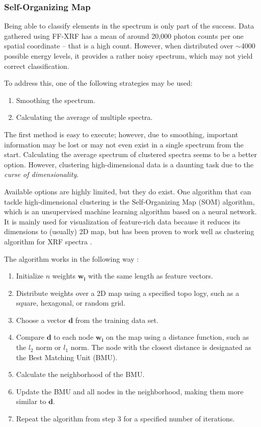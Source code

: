 \subsubsection{Self-Organizing Map}
Being able to classify elements in the spectrum is only part of the success. Data gathered using FF-XRF has a mean of around 20,000 photon counts per one spatial coordinate – that is a high count. However, when distributed over $\sim$4000 possible energy levels, it provides a rather noisy spectrum, which may not yield correct classification.

To address this, one of the following strategies may be used:
\begin{enumerate}
  \item Smoothing the spectrum.
  \item Calculating the average of multiple spectra.
\end{enumerate}

The first method is easy to execute; however, due to smoothing, important information may be lost or may not even exist in a single spectrum from the start. 
Calculating the average spectrum of clustered spectra seems to be a better option. 
However, clustering high-dimensional data is a daunting task due to the \emph{curse of dimensionality}.

Available options are highly limited, but they do exist. 
One algorithm that can tackle high-dimensional clustering is the Self-Organizing Map (SOM) algorithm, which is an unsupervised machine learning algorithm based on a neural network. 
It is mainly used for visualization of feature-rich data because it reduces its dimensions to (usually) 2D map, but has been proven to work well as clustering algorithm for XRF spectra \cite{Kogou2020}.

The algorithm works in the following way \cite{somTutorial}: 
\begin{enumerate}
    \item Initialize $n$ weights $\mathbf{w_i}$ with the same length as feature vectors.
    \item Distribute weights over a 2D map using a specified topo logy, such as a square, hexagonal, or random grid.
    \item Choose a vector $\mathbf{d}$ from the training data set.
    \item Compare $\mathbf{d}$ to each node $\mathbf{w_i}$ on the map using a distance function, such as the $l_2$ norm or $l_1$ norm. The node with the closest distance is designated as the Best Matching Unit (BMU).
    \item Calculate the neighborhood of the BMU.
    \item Update the BMU and all nodes in the neighborhood, making them more similar to $\mathbf{d}$.
    \item Repeat the algorithm from step 3 for a specified number of iterations.
\end{enumerate}

